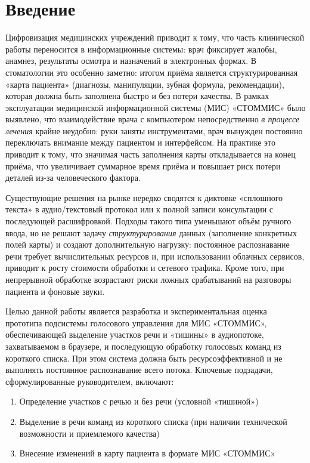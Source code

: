 
\section*{Введение}
\thispagestyle{withCompileDate}

Цифровизация медицинских учреждений приводит к тому, что часть клинической работы переносится в информационные системы: врач фиксирует жалобы, анамнез, результаты осмотра и назначений в электронных формах.
В стоматологии это особенно заметно: итогом приёма является структурированная «карта пациента» (диагнозы, манипуляции, зубная формула, рекомендации), которая должна быть заполнена быстро и без потери качества.
В рамках эксплуатации медицинской информационной системы (МИС) «СТОММИС» было выявлено, что взаимодействие врача с компьютером непосредственно \emph{в процессе лечения} крайне неудобно: руки заняты инструментами, врач вынужден постоянно переключать внимание между пациентом и интерфейсом.
На практике это приводит к тому, что значимая часть заполнения карты откладывается на конец приёма, что увеличивает суммарное время приёма и повышает риск потери деталей из-за человеческого фактора.

Существующие решения на рынке нередко сводятся к диктовке «сплошного текста» в аудио/текстовый протокол или к полной записи консультации с последующей расшифровкой.
Подходы такого типа уменьшают объём ручного ввода, но не решают задачу \emph{структурирования} данных (заполнение конкретных полей карты) и создают дополнительную нагрузку: постоянное распознавание речи требует вычислительных ресурсов и, при использовании облачных сервисов, приводит к росту стоимости обработки и сетевого трафика.
Кроме того, при непрерывной обработке возрастают риски ложных срабатываний на разговоры пациента и фоновые звуки.

Целью данной работы является разработка и экспериментальная оценка прототипа подсистемы голосового управления для МИС «СТОММИС», обеспечивающей выделение участков речи и «тишины» в аудиопотоке, захватываемом в браузере, и последующую обработку голосовых команд из короткого списка.
При этом система должна быть ресурсоэффективной и не выполнять постоянное распознавание всего потока.
Ключевые подзадачи, сформулированные руководителем, включают:
\begin{enumerate}
    \item Определение участков с речью и без речи (условной «тишиной»)
    \item Выделение в речи команд из короткого списка (при наличии технической возможности и приемлемого качества)
    \item Внесение изменений в карту пациента в формате МИС «СТОММИС»
\end{enumerate}


